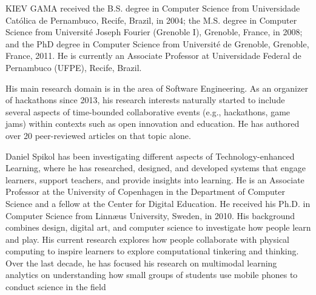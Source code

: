 \documentclass{ieeeaccess}
\begin{document}
\begin{IEEEbiography}
{KIEV GAMA} received the B.S. degree in Computer Science from Universidade Católica de Pernambuco, Recife, Brazil, in 2004; the M.S. degree in Computer Science from Université Joseph Fourier (Grenoble I), Grenoble, France, in 2008; and the PhD degree in Computer Science from Université de Grenoble, Grenoble, France, 2011. He is currently an Associate Professor at Universidade Federal de Pernambuco (UFPE), Recife, Brazil.

His main research domain is in the area of Software Engineering. As an organizer of hackathons since 2013, his research interests naturally started to include several aspects of time-bounded collaborative events (e.g., hackathons, game jams) within contexts such as open innovation and education. He has authored over 20 peer-reviewed articles on that topic alone.
\end{IEEEbiography}

\begin{IEEEbiography}
{Daniel Spikol} has been investigating different aspects of Technology-enhanced Learning, where he has researched, designed, and developed systems that engage learners, support teachers, and provide insights into learning. He is an Associate Professor at the University of Copenhagen in the Department of Computer Science and a fellow at the Center for Digital Education. He received his Ph.D. in Computer Science from Linnæus University, Sweden, in 2010. His background combines design, digital art, and computer science to investigate how people learn and play. His current research explores how people collaborate with physical computing to inspire learners to explore computational tinkering and thinking. Over the last decade, he has focused his research on multimodal learning analytics on understanding how small groups of students use mobile phones to conduct science in the field
\end{IEEEbiography}
\end{document}
